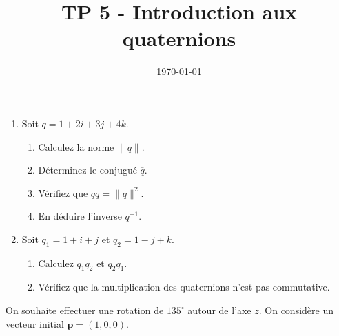 \documentclass[a4paper,12pt]{article}
\title{TP 5 - Introduction aux quaternions}
\author{}
\date{\today}
\begin{document}
\makeonlytitle


\label{exo:theorique}

\begin{enumerate}
	\item Soit \( q = 1 + 2i + 3j + 4k \).
	      \begin{enumerate}
		      \item Calculez la norme \( \lVert q \rVert \).
		      \item Déterminez le conjugué \( \overline{q} \).
		      \item Vérifiez que \( q \overline{q} = \lVert q \rVert^2 \).
		      \item En déduire l'inverse \( q^{-1} \).
	      \end{enumerate}
	\item Soit \( q_1 = 1 + i + j \) et \( q_2 = 1 - j + k \).
	      \begin{enumerate}
		      \item Calculez \( q_1 q_2 \) et \( q_2 q_1 \).
		      \item Vérifiez que la multiplication des quaternions n’est pas commutative.
	      \end{enumerate}
\end{enumerate}



On souhaite effectuer une rotation de $135^\circ$ autour de l’axe $z$. On considère un vecteur initial $\mathbf{p} = (1, 0, 0)$.
\end{document}
